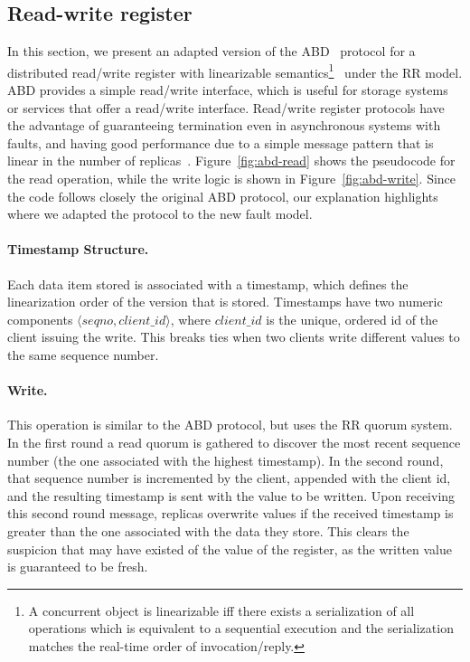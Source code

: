 \subsection{Read-write register}\label{ssec:abd}

In this section, we present an adapted version of the
ABD~\cite{abd} protocol for a distributed read/write register
with linearizable semantics\footnote{A concurrent object is
linearizable iff there exists a serialization of all operations
which is equivalent to a sequential execution and the
serialization matches the real-time order of
invocation/reply.}~\cite{linearizability} under the \ac{RR}
model. ABD provides a simple read/write interface, which is
useful for storage systems or services that offer a read/write
interface. Read/write register protocols have the advantage of
guaranteeing termination even in asynchronous systems with
faults, and having good performance due to a simple message
pattern that is linear in the number of
replicas~\cite{gryff:nsdi20}.
%
Figure~\ref{fig:abd-read} shows the pseudocode for the read
operation, while the write logic is shown in
Figure~\ref{fig:abd-write}. Since the code follows closely the
original ABD protocol, our explanation highlights where we
adapted the protocol to the new fault model.

\paragraph{Timestamp Structure.}
Each data item stored is associated with a
timestamp, which defines the linearization order of the version
that is stored. Timestamps have two numeric components $\langle
seqno, client\_id \rangle$, where $client\_id$ is the
unique, ordered id of the client issuing the write.  This
breaks ties when two clients write different values to the same
sequence number.

\paragraph{Write.}  This operation is similar to the ABD
protocol, but uses the \ac{RR} quorum system. In the first round
a read quorum is gathered to discover the most recent sequence number
(the one associated with the highest timestamp).  In the second round,
that sequence number is incremented by the client, appended with the
client id, and the resulting timestamp is sent with the value to be
written. Upon receiving this second round message, replicas overwrite
values if the received timestamp is greater than the one associated
with the data they store. This clears the suspicion that may have
existed of the value of the register, as the written value is
guaranteed to be fresh.


